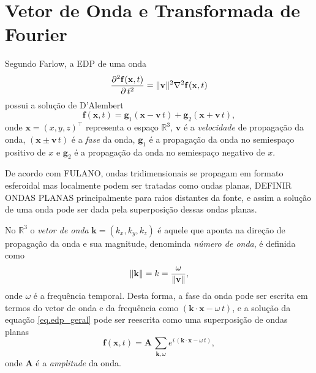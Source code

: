 \chapter{Vetor de Onda e Transformada de Fourier}
Segundo Farlow, a EDP de uma onda 
\begin{equation}\label{eq.edp_geral}
\frac{\partial^2\mathbf{f}(\mathbf{x},t)}{\partial\,t^2}=\lVert\mathbf{v}\rVert^2\nabla^2\mathbf{f}(\mathbf{x},t)
\end{equation}
possui a solu\c{c}\~ao de D'Alembert
\begin{equation}
\mathbf{f}(\mathbf{x},t)=\mathbf{g}_1(\mathbf{x}-\mathbf{v}\,t)+\mathbf{g}_2(\mathbf{x}+\mathbf{v}\,t),
\end{equation}
onde $\mathbf{x}=(x,y,z)^\top$ representa o espa\c{c}o $\mathbb{R}^3$, $\mathbf{v}$ \'e a \textit{velocidade} de propaga\c{c}\~ao da onda, $(\mathbf{x}\pm\mathbf{v}\,t)$ \'e a \textit{fase} da onda, $\mathbf{g}_1$ \'e a propaga\c{c}\~ao da onda no semiespa\c{c}o positivo de $x$ e $\mathbf{g}_2$ \'e a propaga\c{c}\~ao da onda no semiespa\c{c}o negativo de $x$.

De acordo com FULANO, ondas tridimensionais se propagam em formato esferoidal mas localmente podem ser tratadas como ondas planas, DEFINIR ONDAS PLANAS principalmente para raios distantes da fonte, e assim a solu\c{c}\~ao de uma onda pode ser dada pela superposi\c{c}\~ao dessas ondas planas.

No $\mathbb{R}^3$ o \textit{vetor de onda} $\mathbf{k}=(k_x,k_y,k_z)$ \'e aquele que aponta na dire\c{c}\~ao de propaga\c{c}\~ao da onda e sua magnitude, denominda \textit{n\'umero de onda}, \'e definida como 
\begin{equation}
\lVert\mathbf{k}\rVert=k=\frac{\omega}{\lVert\mathbf{v}\rVert},
\end{equation}
onde $\omega$ \'e a frequ\^encia temporal. Desta forma, a fase da onda pode ser escrita em termos do vetor de onda e da frequ\^encia como $(\mathbf{k}\cdot\mathbf{x}-\omega\,t)$, e a solu\c{c}\~ao da equa\c{c}\~ao \ref{eq.edp_geral} pode ser reescrita como uma superposi\c{c}\~ao de ondas planas
\begin{equation}
\mathbf{f}(\mathbf{x},t)=\mathbf{A}\,\sum_{\mathbf{k},\omega}{e^{i\,(\mathbf{k}\cdot\mathbf{x}-\omega\,t)}},
\end{equation}
onde $\mathbf{A}$ \'e a \textit{amplitude} da onda.

